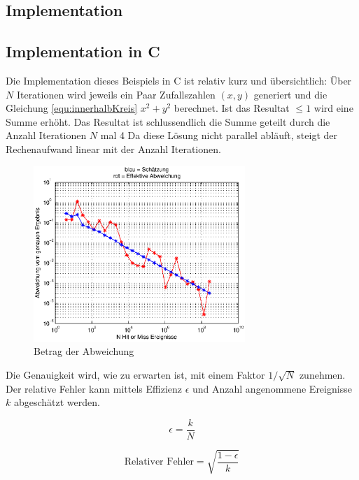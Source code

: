 \documentclass{book}
\begin{document}
\begin{refsection}
\section{Implementation}
\subsection{Implementation in C}
Die Implementation dieses Beispiels in C ist relativ kurz und übersichtlich: Über $N$ Iterationen wird jeweils ein Paar Zufallszahlen $(x,y)$ generiert und die Gleichung \ref{equ:innerhalbKreis} $x^2 + y^2$ berechnet. Ist das Resultat $\leq1$ wird eine Summe erhöht. Das Resultat ist schlussendlich die Summe geteilt durch die Anzahl Iterationen $N$ mal 4 Da diese Lösung nicht parallel abläuft, steigt der Rechenaufwand linear mit der Anzahl Iterationen. \\


\begin{figure}[h]
    \centering
    \includegraphics[width=8cm]{images/Fehler.eps}
    \caption{Betrag der Abweichung}
    \label{fig:Fehler}
\end{figure}

Die Genauigkeit wird, wie zu erwarten ist, mit einem Faktor $1/\sqrt{N}$ zunehmen. Der relative Fehler kann mittels Effizienz $\epsilon$ und Anzahl angenommene Ereignisse $k$ abgeschätzt werden.

\begin{equation}
	\epsilon = \frac{k}{N}
\end{equation} 

\begin{equation}
	\text{Relativer Fehler} = \sqrt{\frac{1-\epsilon}{k}}
	\label{eq:relativer_Fehler}
\end{equation}


\end{refsection}
\end{document}
